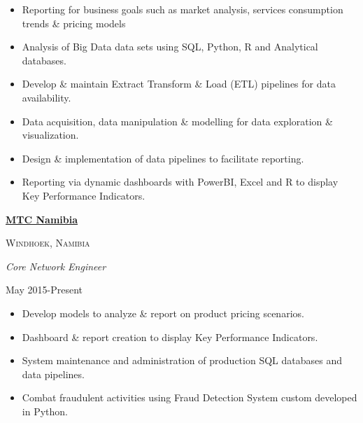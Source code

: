 \documentclass[
  letterpaper,
  DIV=11,
  numbers=noendperiod]{scrartcl}
\providecommand{\tightlist}{%
  \setlength{\itemsep}{0pt}\setlength{\parskip}{0pt}}\usepackage{longtable,booktabs,array}
\begin{document}
\begin{itemize}
\tightlist
\item
  Reporting for business goals such as market analysis, services
  consumption trends \& pricing models
\item
  Analysis of Big Data data sets using SQL, Python, R and Analytical
  databases.
\item
  Develop \& maintain Extract Transform \& Load (ETL) pipelines for data
  availability.
\item
  Data acquisition, data manipulation \& modelling for data exploration
  \& visualization.
\item
  Design \& implementation of data pipelines to facilitate reporting.
\item
  Reporting via dynamic dashboards with PowerBI, Excel and R to display
  Key Performance Indicators.
\end{itemize}

\vspace{5pt}

\begin{large}
  \begin{multicols}{2}
    \begin{flushleft}{\bf \href{https://www.mtc.com.na/}{MTC Namibia}}\end{flushleft}
    \begin{flushright}\textsc{Windhoek, Namibia}\end{flushright}
  \end{multicols}
  \vspace{-0.17cm}
  \begin{multicols}{2}
    \begin{flushleft}\textit{Core Network Engineer}\end{flushleft}
    \begin{flushright}May 2015-Present\end{flushright}
  \end{multicols}
\end{large}
\vspace{-0.16cm}

\begin{itemize}
\tightlist
\item
  Develop models to analyze \& report on product pricing scenarios.
\item
  Dashboard \& report creation to display Key Performance Indicators.
\item
  System maintenance and administration of production SQL databases and
  data pipelines.
\item
  Combat fraudulent activities using Fraud Detection System custom
  developed in Python.
\end{itemize}
\end{document}
